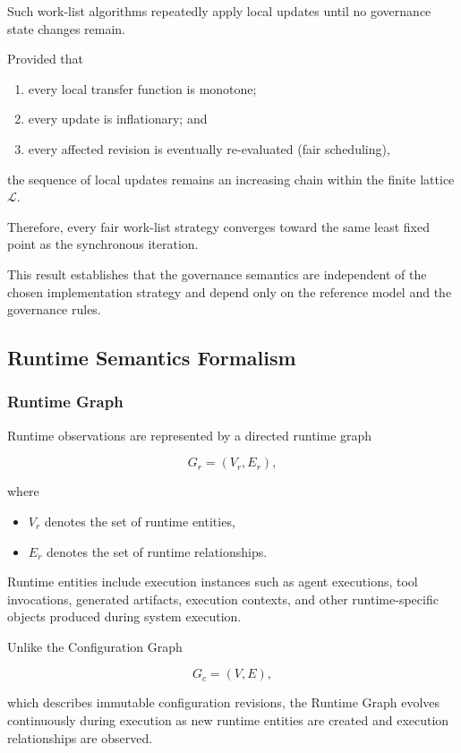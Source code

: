 \documentclass[10pt]{article}
\begin{document}
Such work-list algorithms repeatedly apply local updates until no governance
state changes remain.

Provided that

\begin{enumerate}
	\item every local transfer function is monotone;
	\item every update is inflationary; and
	\item every affected revision is eventually re-evaluated (fair scheduling),
\end{enumerate}

the sequence of local updates remains an increasing chain within the finite
lattice $\mathcal{L}$.

Therefore, every fair work-list strategy converges toward the same least fixed
point as the synchronous iteration.

This result establishes that the governance semantics are independent of the
chosen implementation strategy and depend only on the reference model and the
governance rules.

\subsection{Runtime Semantics Formalism}
\label{appendix:runtime_semantics}
\subsubsection{Runtime Graph}

Runtime observations are represented by a directed runtime graph

\[
G_r=(V_r,E_r),
\tag{25}
\]

where

\begin{itemize}
	\item $V_r$ denotes the set of runtime entities,
	\item $E_r$ denotes the set of runtime relationships.
\end{itemize}

Runtime entities include execution instances such as agent executions,
tool invocations, generated artifacts, execution contexts, and other
runtime-specific objects produced during system execution.

Unlike the Configuration Graph

\[
G_c=(V,E),
\]

which describes immutable configuration revisions, the Runtime Graph evolves
continuously during execution as new runtime entities are created and execution
relationships are observed.
\end{document}
